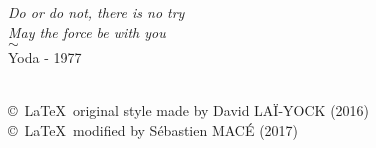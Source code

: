 





\def\titre{Titre}    %
\def\auteur{Anne \textsc{Martin}}  %
\def\numetu{00000000}
\graphicspath{{figures/}} 

\setcounter{tocdepth}{3} %
\setcounter{secnumdepth}{3}





\newpage 
\thispagestyle{empty}
\null
\newpage
\begin{dedication}
	\textit{Do or do not, there is no try\\May the force be with you }\\[0.3cm]
	
	$\sim $\\[0.3cm]
	
	Yoda - 1977	
\end{dedication}
\setcounter{page}{2}
\newpage ~\\[19cm] 
\copyright \ \LaTeX \ original style made by  David LAÏ-YOCK (2016)\\
\copyright \ \LaTeX \ modified by  Sébastien MACÉ (2017)  

\newpage
\null
\newpage
{}

\newpage 
\null
\newpage
\pagestyle{empty}
\thispagestyle{empty}
\tableofcontents
{}
\thispagestyle{empty}

